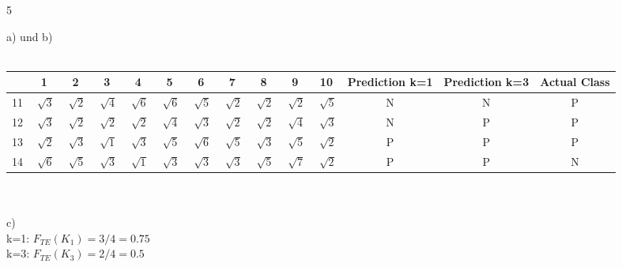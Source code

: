 \documentclass{article}
\begin{document}
    \begin{ukon-infie}[29.11.17]{5}

        \begin{exercise}[p=10]{}
       
		\end{exercise}
		
		\begin{exercise}[p=10]{}
		a) und b)\\\\
		\begin{tabular}{|c|c|c|c|c|c|c|c|c|c|c|c|c|c|}
		\hline 
		 & 1 & 2 & 3 & 4 & 5 & 6 & 7 & 8 & 9 & 10 & Prediction k=1 & Prediction k=3 & Actual Class \\ 
		\hline 
		11 & $\sqrt[]{3}$ & $\sqrt[]{2}$ & $\sqrt[]{4}$ & $\sqrt[]{6}$ & $\sqrt[]{6}$ & $\sqrt[]{5}$ & $\sqrt[]{2}$ & $\sqrt[]{2}$ & $\sqrt[]{2}$ & $\sqrt[]{5}$ & N & N & P \\ 
		\hline 
		12 & $\sqrt[]{3}$ & $\sqrt[]{2}$ & $\sqrt[]{2}$ & $\sqrt[]{2}$ & $\sqrt[]{4}$ & $\sqrt[]{3}$ & $\sqrt[]{2}$ & $\sqrt[]{2}$ & $\sqrt[]{4}$ & $\sqrt[]{3}$ & N & P & P \\ 
		\hline 
		13 & $\sqrt[]{2}$ & $\sqrt[]{3}$ & $\sqrt[]{1}$ & $\sqrt[]{3}$ & $\sqrt[]{5}$ & $\sqrt[]{6}$ & $\sqrt[]{5}$ & $\sqrt[]{3}$ & $\sqrt[]{5}$ & $\sqrt[]{2}$ & P & P & P \\ 
		\hline 
		14 & $\sqrt[]{6}$ & $\sqrt[]{5}$ & $\sqrt[]{3}$ & $\sqrt[]{1}$ & $\sqrt[]{3}$ & $\sqrt[]{3}$ & $\sqrt[]{3}$ & $\sqrt[]{5}$ & $\sqrt[]{7}$ & $\sqrt[]{2}$ & P & P & N \\ 
		\hline 
		\end{tabular}\\\\
		c) \\
		k=1: $F_{TE}(K_1) = 3/4 =0.75$\\
		k=3: $F_{TE}(K_3) = 2/4 =0.5$\\
		
		\end{exercise}
		
		\begin{exercise}[p=4]{}
			
		\end{exercise}
		
		


		\begin{exercise}[p=3]{}
		

		\end{exercise}
		
		
\end{ukon-infie}
\end{document}

